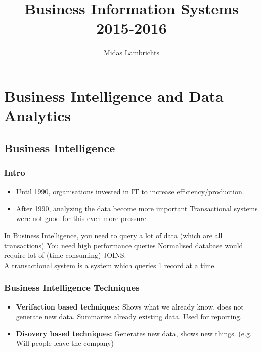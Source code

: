 \documentclass[a4paper,twoside,10pt]{report}
\begin{document}
\pagestyle{empty} %



\title{Business Information Systems \\ 2015-2016}
\author{Midas Lambrichts}
\maketitle


\tableofcontents %
\cleardoublepage %

\pagestyle{plain} %


\chapter{Business Intelligence and Data Analytics}
\section{Business Intelligence}
\subsection{Intro}
\begin{itemize}
	\item Until 1990, organisations invested in IT to increase efficiency/production.
	\item After 1990, analyzing the data become more important \Rightarrow Transactional systems were not good for this \Rightarrow even more pressure.
\end{itemize}

In Business Intelligence, you need to query a lot of data (which are all transactions) \Rightarrow You need high performance queries \Leftrightarrow Normalised database would require lot of (time consuming) JOINS.
\\
A transactional system is a system which queries 1 record at a time.

\subsection{Business Intelligence Techniques}
\begin{itemize}
	\item \textbf{Verifaction based techniques:} Shows what we already know, does not generate new data. Summarize already existing data. Used for reporting.
	\item \textbf{Disovery based techniques:} Generates new data, shows new things. (e.g. Will people leave the company)
\end{itemize}
\end{document}
